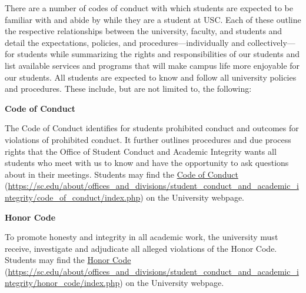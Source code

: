 \documentclass[11pt,letterpaper]{article}
\begin{document}

There are a number of codes of conduct with which students are expected to be familiar with and abide by while they are a student at USC. Each of these outline the respective relationships between the university, faculty, and students and detail the expectations, policies, and procedures---individually and collectively---for students while summarizing the rights and responsibilities of our students and list available services and programs that will make campus life more enjoyable for our students. All students are expected to know and follow all university policies and procedures. These include, but are not limited to, the following: \pspace

{\bfseries Code of Conduct} \par
The Code of Conduct identifies for students prohibited conduct and outcomes for violations of prohibited conduct. It further outlines procedures and due process rights that the Office of Student Conduct and Academic Integrity wants all students who meet with us to know and have the opportunity to ask questions about in their meetings. Students may find the \href{https://sc.edu/about/offices\_and\_divisions/student\_conduct\_and\_academic\_integrity/code\_of\_conduct/index.php}{Code of Conduct} (\url{https://sc.edu/about/offices\_and\_divisions/student\_conduct\_and\_academic\_integrity/code\_of\_conduct/index.php}) on the University webpage. \pspace

{\bfseries Honor Code} \par
To promote honesty and integrity in all academic work, the university must receive, investigate and adjudicate all alleged violations of the Honor Code. Students may find the \href{https://sc.edu/about/offices\_and\_divisions/student\_conduct\_and\_academic\_integrity/honor\_code/index.php}{Honor Code} (\url{https://sc.edu/about/offices\_and\_divisions/student\_conduct\_and\_academic\_integrity/honor\_code/index.php}) on the University webpage. \pspace
\end{document}
